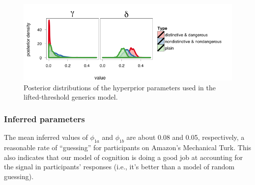 \documentclass[10pt,letterpaper]{article}
\begin{document}
%    



\begin{figure}
\centering
    \includegraphics[width=\columnwidth]{lvRSA_hyperparams_sidebyside}
  \caption{Posterior distributions of the hyperprior parameters used in the lifted-threshold generics model.}
   \label{fig:posthyper}
\end{figure}

\subsubsection{Inferred parameters}
The mean inferred values of  $\phi_{1a}$ and $\phi_{1b}$ are about 0.08 and 0.05, respectively, a reasonable rate of ``guessing'' for participants on Amazon's Mechanical Turk. This also  indicates that our model of cognition is doing a good job at accounting for the signal in participants' responses (i.e., it's better than a model of random guessing).

\end{document}
